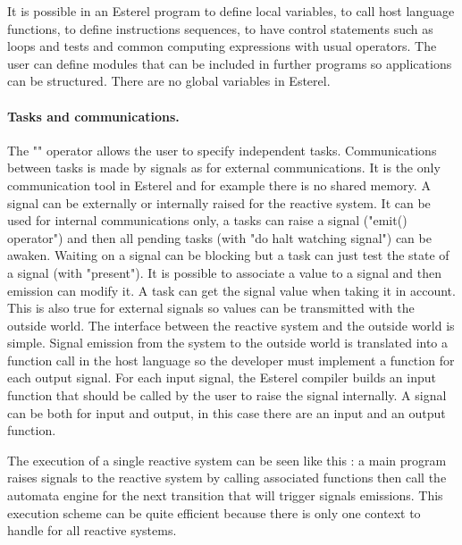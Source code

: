\documentclass[10pt]{report}
\begin{document}
It is possible in an Esterel program to define local variables, to call host language functions, to define instructions sequences,
to have control statements such as loops and tests and common computing expressions with usual operators. The user can define modules
that can be included in further programs so applications can be structured. There are no global variables in Esterel.

\paragraph{Tasks and communications.} The "\textbar\textbar" operator allows the user to specify independent tasks. Communications between
tasks is made by signals as for external communications. It is the only communication tool in Esterel and for example there is no
shared memory. A signal can be externally or internally raised for the reactive system. It can be used for internal communications
only, a tasks can raise a signal ("emit() operator") and then all pending tasks (with "do halt watching signal") can be awaken.
Waiting on a signal can be blocking but a task can just test the state of a signal (with "present"). It is possible to
associate a value to a signal and then emission can modify it. A task can get the signal value when taking it in account.
This is also true for external signals so values can be transmitted with the outside world. The interface between the reactive
system and the outside world is simple. Signal emission from the system to the outside world is translated into a function call
in the host language so the developer must implement a function for each output signal. For each input signal, the Esterel
compiler builds an input function that should be called by the user to raise the signal internally. A signal can be both for
input and output, in this case there are an input and an output function.

The execution of a single reactive system can be seen like this : a main program raises signals to the reactive system by
calling associated functions then call the automata engine for the next transition that will trigger signals emissions. This
execution scheme can be quite efficient because there is only one context to handle for all reactive systems.
\end{document}
